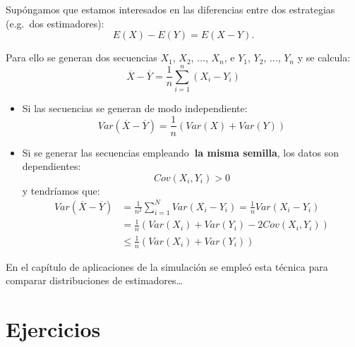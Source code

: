 \documentclass[
]{book}
\theoremstyle{break}
\theoremstyle{nonumberplain}
\begin{document}
Supóngamos que estamos interesados en las diferencias entre dos
estrategias (e.g.~dos estimadores):
\[E\left(  X\right)  -E\left(  Y\right)  =E\left(  X-Y\right).\]

Para ello se generan dos secuencias \(X_{1}\), \(X_{2}\), \(\ldots\),
\(X_{n}\), e \(Y_{1}\), \(Y_{2}\), \(\ldots\), \(Y_{n}\) y se calcula:
\[\overline{X}-\overline{Y}=\frac{1}{n}\sum_{i=1}^{n}\left(  X_{i}-Y_{i}\right)\]

\begin{itemize}
\item
  Si las secuencias se generan de modo independiente:
  \[Var\left( \overline{X} - \overline{Y} \right) 
  = \frac{1}{n} \left( Var\left( X \right) + Var\left( Y \right) \right)\]
\item
  Si se generar las secuencias empleando\textbf{~la misma semilla},
  los datos son dependientes:
  \[Cov\left( X_{i}, Y_{i} \right) > 0\]
  y tendríamos que:
  \[\begin{aligned}
  Var\left( \overline{X}-\overline{Y}\right)  &
  = \frac{1}{n^{2}}\sum_{i=1}^{N}Var\left( X_{i}-Y_{i}\right) 
  = \frac{1}{n}Var\left( X_{i}-Y_{i}\right) \\
  & = \frac{1}{n}\left( Var\left( X_{i} \right) + Var\left( Y_{i} \right)
  - 2Cov\left( X_{i},Y_{i} \right) \right) \\
  & \leq \frac{1}{n}\left( Var\left( X_{i} \right) 
  + Var\left( Y_{i}\right) \right)
  \end{aligned}\]
\end{itemize}

En el capítulo de aplicaciones de la simulación se empleó esta técnica para comparar distribuciones de estimadores\ldots{}

\hypertarget{ejercicios-2}{%
\section{Ejercicios}\label{ejercicios-2}}
\end{document}
